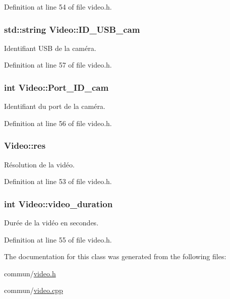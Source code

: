 Definition at line 54 of file video.\-h.

\hypertarget{classVideo_adf86ca32c0e37e971fcfa66a18c090f0}{
\subsubsection[{I\-D\-\_\-\-U\-S\-B\-\_\-cam}]{\setlength{\rightskip}{0pt plus 5cm}std\-::string Video\-::\-I\-D\-\_\-\-U\-S\-B\-\_\-cam\hspace{0.3cm}{\ttfamily [private]}}}\label{classVideo_adf86ca32c0e37e971fcfa66a18c090f0}
Identifiant U\-S\-B de la caméra. 

Definition at line 57 of file video.\-h.

\hypertarget{classVideo_ad2d7366bb2fe431b8551b2df2543ba8a}{
\subsubsection[{Port\-\_\-\-I\-D\-\_\-cam}]{\setlength{\rightskip}{0pt plus 5cm}int Video\-::\-Port\-\_\-\-I\-D\-\_\-cam\hspace{0.3cm}{\ttfamily [private]}}}\label{classVideo_ad2d7366bb2fe431b8551b2df2543ba8a}
Identifiant du port de la caméra. 

Definition at line 56 of file video.\-h.

\hypertarget{classVideo_a9bb278cf235b00f875d9c86f049c94b1}{
\subsubsection[{res}]{ Video\-::res\hspace{0.3cm}{\ttfamily [private]}}}\label{classVideo_a9bb278cf235b00f875d9c86f049c94b1}
Résolution de la vidéo. 

Definition at line 53 of file video.\-h.

\hypertarget{classVideo_a1cd495d4d34fb5ce52237457508dbf40}{
\subsubsection[{video\-\_\-duration}]{\setlength{\rightskip}{0pt plus 5cm}int Video\-::video\-\_\-duration\hspace{0.3cm}{\ttfamily [private]}}}\label{classVideo_a1cd495d4d34fb5ce52237457508dbf40}
Durée de la vidéo en secondes. 

Definition at line 55 of file video.\-h.



The documentation for this class was generated from the following files\-:\begin{DoxyCompactItemize}
\item 
commun/\hyperlink{video_8h}{video.\-h}\item 
commun/\hyperlink{video_8cpp}{video.\-cpp}\end{DoxyCompactItemize}
